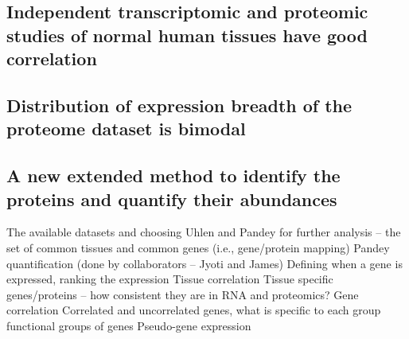 \subsection{Independent transcriptomic and proteomic studies of normal human tissues
have good correlation}


\subsection{Distribution of expression breadth of the proteome dataset is bimodal}

\subsection{A new extended method to identify the proteins and quantify their abundances}



The available datasets and choosing Uhlen and Pandey for further analysis – the set of common tissues and common genes (i.e., gene/protein mapping)
Pandey quantification (done by collaborators – Jyoti and James)
Defining when a gene is expressed, ranking the expression
Tissue correlation
Tissue specific genes/proteins – how consistent they are in RNA and proteomics?
Gene correlation
Correlated and uncorrelated genes, what is specific to each group
functional groups of genes
Pseudo-gene expression



